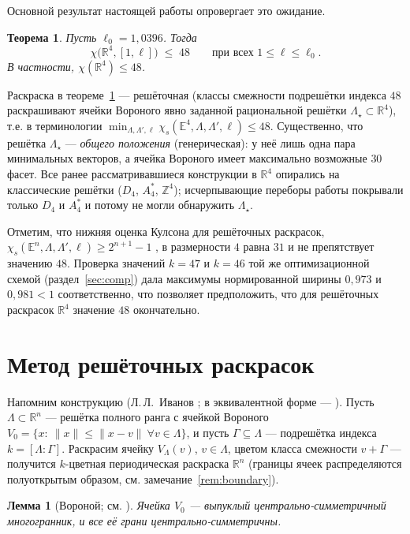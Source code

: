 \documentclass[12pt]{article}
\newtheorem{theorem}{Теорема}
\newtheorem{lemma}{Лемма}
\theoremstyle{definition}
\theoremstyle{remark}
\newcommand{\R}{\mathbb{R}}
\newcommand{\Z}{\mathbb{Z}}
\newcommand{\E}{\mathbb{E}}
\begin{document}
Основной результат настоящей работы опровергает это ожидание.

\begin{theorem}\label{thm:main}
Пусть $\ell_0=1{,}0396$. Тогда
\[
\chi\bigl(\R^4,[1,\ell]\bigr)\;\le\;48
\qquad\text{при всех }1\le\ell\le\ell_0 .
\]
В частности, $\chi(\R^4)\le 48$.
\end{theorem}

Раскраска в теореме~\ref{thm:main} --- решёточная (классы смежности подрешётки
индекса $48$ раскрашивают ячейки Вороного явно заданной рациональной решётки
$\Lambda_\star\subset\R^4$), т.е. в терминологии \cite{ABPR}
$\min_{\Lambda,\Lambda',\ell}\chi_s(\E^4,\Lambda,\Lambda',\ell)\le 48$.
Существенно, что решётка $\Lambda_\star$ --- \emph{общего положения}
(генерическая): у неё лишь одна пара минимальных векторов, а ячейка Вороного
имеет максимально возможные $30$ фасет. Все ранее рассматривавшиеся
конструкции в $\R^4$ опирались на классические решётки ($D_4$, $A_4^*$,
$\Z^4$); исчерпывающие переборы работы \cite{ABPR} покрывали только $D_4$ и
$A_4^*$ и потому не могли обнаружить $\Lambda_\star$.

Отметим, что нижняя оценка Кулсона для решёточных раскрасок,
$\chi_s(\E^n,\Lambda,\Lambda',\ell)\ge 2^{n+1}-1$ \cite{Coulson,ABPR}, в
размерности $4$ равна $31$ и не препятствует значению $48$. Проверка значений
$k=47$ и $k=46$ той же оптимизационной схемой (раздел~\ref{sec:comp}) дала
максимумы нормированной ширины $0{,}973$ и $0{,}981<1$ соответственно, что
позволяет предположить, что для решёточных раскрасок $\R^4$ значение $48$
окончательно.

\section{Метод решёточных раскрасок}\label{sec:method}

Напомним конструкцию (Л.\,Л.~Иванов \cite{Ivanov2011}; в эквивалентной форме
--- \cite[предложение~5]{ABPR}). Пусть $\Lambda\subset\R^n$ --- решётка полного
ранга с ячейкой Вороного
$V_0=\{x:\ \|x\|\le\|x-v\|\ \forall v\in\Lambda\}$, и пусть
$\Gamma\subseteq\Lambda$ --- подрешётка индекса $k=[\Lambda:\Gamma]$. Раскрасим
ячейку $V_\Lambda(v)$, $v\in\Lambda$, цветом класса смежности $v+\Gamma$ ---
получится $k$-цветная периодическая раскраска $\R^n$ (границы ячеек
распределяются полуоткрытым образом, см. замечание~\ref{rem:boundary}).

\begin{lemma}[Вороной; см. \cite{Voronoi}]\label{lem:sym}
Ячейка $V_0$ --- выпуклый центрально-симметричный многогранник, и все её грани
центрально-симметричны.
\end{lemma}
\end{document}
